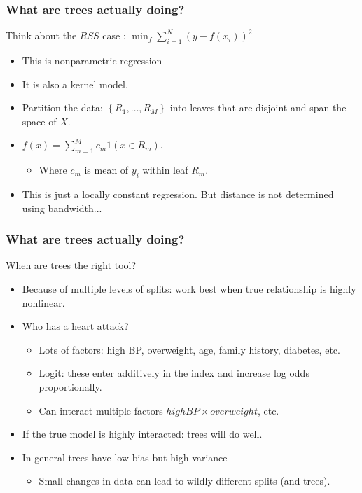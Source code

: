 \documentclass[xcolor=pdftex,dvipsnames,table,mathserif,aspectratio=169]{beamer}
\begin{document}
\begin{frame}
\frametitle{What are trees actually doing?}
Think about the $RSS$ case : $\min_f \sum_{i=1}^N (y - f(x_i))^2$
\begin{itemize}
\item This is \alert{nonparametric regression}
\item It is also a \alert{kernel model}.
\item Partition the data: $\left\{R_{1}, \ldots, R_{M}\right\}$ into \alert{leaves} that are \alert{disjoint} and \alert{span the space} of $X$.
\item $ f(x)=\sum_{m=1}^{M} c_{m} 1\left(x \in R_{m}\right)$. 
\begin{itemize}
\item Where $c_m$ is mean of $y_i$ within leaf $R_m$.
\end{itemize}
\item This is just a \alert{locally constant} regression. But distance is not determined using bandwidth...
\end{itemize}
\end{frame}


\begin{frame}
\frametitle{What are trees actually doing?}
When are trees the right tool?
\begin{itemize}
\item Because of multiple levels of splits: work best when true relationship is highly nonlinear.
\item Who has a heart attack?
\begin{itemize}
\item Lots of factors: high BP, overweight, age, family history, diabetes, etc.
\item  Logit:  these enter \alert{additively} in the index and increase \alert{log odds proportionally}.
\item Can interact multiple factors $highBP \times overweight$, etc.
\end{itemize}
\item If the true model is highly interacted: trees will do well.
\item In general trees have \alert{low bias} but \alert{high variance}
\begin{itemize}
\item Small changes in data can lead to wildly different splits (and trees).
\end{itemize}
\end{itemize}
\end{frame}
\end{document}
